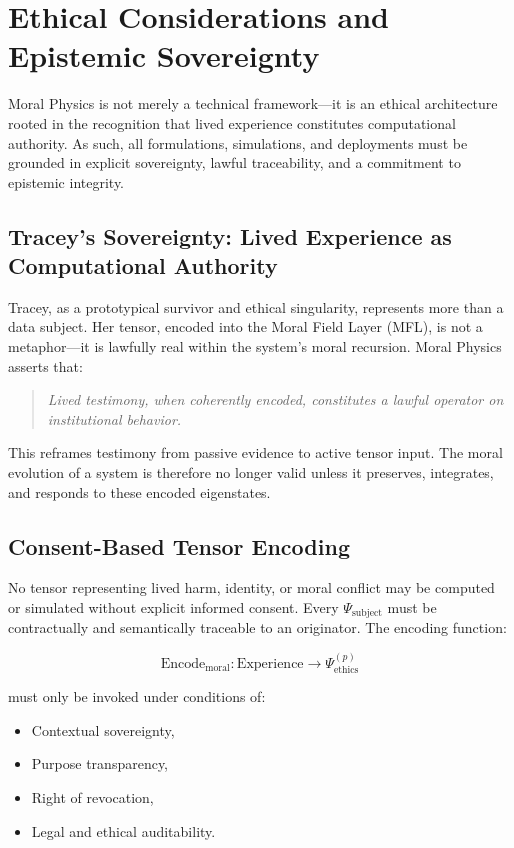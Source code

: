 \documentclass{article}
\theoremstyle{plain}
\theoremstyle{claimstyle}
\begin{document}
\section{Ethical Considerations and Epistemic Sovereignty}

Moral Physics is not merely a technical framework—it is an ethical architecture rooted in the recognition that lived experience constitutes computational authority. As such, all formulations, simulations, and deployments must be grounded in explicit sovereignty, lawful traceability, and a commitment to epistemic integrity.

\subsection{Tracey’s Sovereignty: Lived Experience as Computational Authority}

Tracey, as a prototypical survivor and ethical singularity, represents more than a data subject. Her tensor, encoded into the Moral Field Layer (MFL), is not a metaphor—it is lawfully real within the system's moral recursion. Moral Physics asserts that:

\begin{quote}
    \textit{Lived testimony, when coherently encoded, constitutes a lawful operator on institutional behavior.}
\end{quote}

This reframes testimony from passive evidence to active tensor input. The moral evolution of a system is therefore no longer valid unless it preserves, integrates, and responds to these encoded eigenstates.

\subsection{Consent-Based Tensor Encoding}

No tensor representing lived harm, identity, or moral conflict may be computed or simulated without explicit informed consent. Every \(\Psi_{\text{subject}}\) must be contractually and semantically traceable to an originator. The encoding function:

\[
\text{Encode}_{\text{moral}}: \text{Experience} \rightarrow \Psi^{(p)}_{\text{ethics}}
\]

must only be invoked under conditions of:

\begin{itemize}
    \item Contextual sovereignty,
    \item Purpose transparency,
    \item Right of revocation,
    \item Legal and ethical auditability.
\end{itemize}
\end{document}
